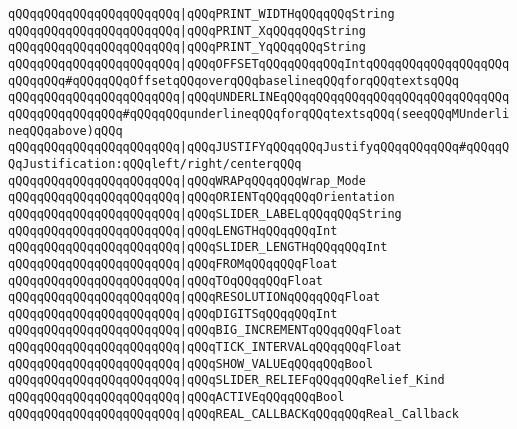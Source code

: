\verb|qQQqqQQqqQQqqQQqqQQqqQQq|\verb#|qQQqPRINT_WIDTHqQQqqQQqString#\newline
\verb|qQQqqQQqqQQqqQQqqQQqqQQq|\verb#|qQQqPRINT_XqQQqqQQqString#\newline
\verb|qQQqqQQqqQQqqQQqqQQqqQQq|\verb#|qQQqPRINT_YqQQqqQQqString#\newline
\verb|qQQqqQQqqQQqqQQqqQQqqQQq|\verb#|qQQqOFFSETqQQqqQQqqQQqIntqQQqqQQqqQQqqQQqqQQqqQQqqQQq#\verb|#qQQqqQQqOffsetqQQqoverqQQqbaselineqQQqforqQQqtextsqQQq|\newline
\verb|qQQqqQQqqQQqqQQqqQQqqQQq|\verb#|qQQqUNDERLINEqQQqqQQqqQQqqQQqqQQqqQQqqQQqqQQqqQQqqQQqqQQqqQQq#\verb|#qQQqqQQqunderlineqQQqforqQQqtextsqQQq(seeqQQqMUnderlineqQQqabove)qQQq|\newline
\verb|qQQqqQQqqQQqqQQqqQQqqQQq|\verb#|qQQqJUSTIFYqQQqqQQqJustifyqQQqqQQqqQQq#\verb|#qQQqqQQqJustification:qQQqleft/right/centerqQQq|\newline
\verb|qQQqqQQqqQQqqQQqqQQqqQQq|\verb#|qQQqWRAPqQQqqQQqWrap_Mode#\newline
\verb|qQQqqQQqqQQqqQQqqQQqqQQq|\verb#|qQQqORIENTqQQqqQQqOrientation#\newline
\verb|qQQqqQQqqQQqqQQqqQQqqQQq|\verb#|qQQqSLIDER_LABELqQQqqQQqString#\newline
\verb|qQQqqQQqqQQqqQQqqQQqqQQq|\verb#|qQQqLENGTHqQQqqQQqInt#\newline
\verb|qQQqqQQqqQQqqQQqqQQqqQQq|\verb#|qQQqSLIDER_LENGTHqQQqqQQqInt#\newline
\verb|qQQqqQQqqQQqqQQqqQQqqQQq|\verb#|qQQqFROMqQQqqQQqFloat#\newline
\verb|qQQqqQQqqQQqqQQqqQQqqQQq|\verb#|qQQqTOqQQqqQQqFloat#\newline
\verb|qQQqqQQqqQQqqQQqqQQqqQQq|\verb#|qQQqRESOLUTIONqQQqqQQqFloat#\newline
\verb|qQQqqQQqqQQqqQQqqQQqqQQq|\verb#|qQQqDIGITSqQQqqQQqInt#\newline
\verb|qQQqqQQqqQQqqQQqqQQqqQQq|\verb#|qQQqBIG_INCREMENTqQQqqQQqFloat#\newline
\verb|qQQqqQQqqQQqqQQqqQQqqQQq|\verb#|qQQqTICK_INTERVALqQQqqQQqFloat#\newline
\verb|qQQqqQQqqQQqqQQqqQQqqQQq|\verb#|qQQqSHOW_VALUEqQQqqQQqBool#\newline
\verb|qQQqqQQqqQQqqQQqqQQqqQQq|\verb#|qQQqSLIDER_RELIEFqQQqqQQqRelief_Kind#\newline
\verb|qQQqqQQqqQQqqQQqqQQqqQQq|\verb#|qQQqACTIVEqQQqqQQqBool#\newline
\verb|qQQqqQQqqQQqqQQqqQQqqQQq|\verb#|qQQqREAL_CALLBACKqQQqqQQqReal_Callback#\newline
